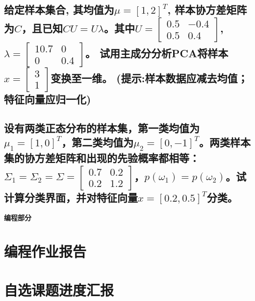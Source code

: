 \documentclass[a4paper]{article}
\begin{document}
\subsection{给定样本集合, 其均值为$\mu=[1, 2]^T$, 样本协方差矩阵为$C$，且已知$CU=U\lambda$。\newline 其中$U=\left[ \begin{array}{cc}
    0.5 & -0.4 \\
    0.5 & 0.4
\end{array} \right]$, $\lambda=\left[ \begin{array}{cc}
    10.7 & 0 \\
    0 & 0.4
\end{array} \right]$。\newline
试用主成分分析PCA将样本$x=\left[ \begin{array}{c}
    3 \\
    1
\end{array} \right]$变换至一维。\newline
(提示:样本数据应减去均值；特征向量应归一化) \\
}


\subsection{设有两类正态分布的样本集，第一类均值为$\mu_1=[1,0]^T$，第二类均值为$\mu_2=[0,-1]^T$。两类样本集的协方差矩阵和出现的先验概率都相等：$\Sigma_1=\Sigma_2=\Sigma=\left[ \begin{array}{cc}
    0.7 & 0.2 \\
    0.2 & 1.2
\end{array} \right]$，$p(\omega_1)=p(\omega_2)$。试计算分类界面，并对特征向量$x=[0.2,0.5]^T$分类。}

\vspace{6mm}
\centerline{\textbf{\Large{编程部分}}}
\vspace{3mm}
\section{编程作业报告}
\section{自选课题进度汇报}
\end{document}
